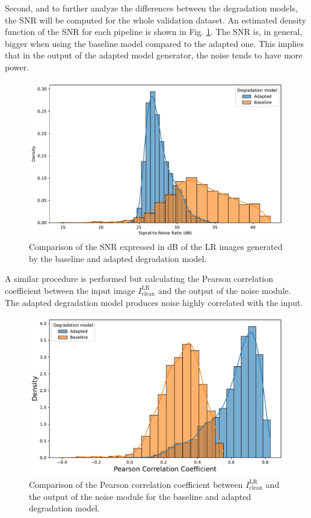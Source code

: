         Second, and to further analyze the differences between the degradation models, the SNR will be computed for the whole validation dataset.
        An estimated density function of the SNR for each pipeline is shown in Fig. \ref{fig:5-source-noise-SNR}.
        The SNR is, in general, bigger when using the baseline model compared to the adapted one.
        This implies that in the output of the adapted model generator, the noise tends to have more power. 

        \begin{figure}[H]
            \centering
            \includegraphics[width=\textwidth]{Includes/5-source-noise-SNR.pdf}
            \caption{Comparison of the SNR expressed in dB of the LR images generated by the baseline and adapted degradation model.}
            \label{fig:5-source-noise-SNR}
        \end{figure}


        A similar procedure is performed but calculating the Pearson correlation coefficient between the input image $I^{\text{LR}}_{\text{clean}}$ and the output of the noise module. The adapted degradation model produces noise highly correlated with the input.


        \begin{figure}[H]
            \centering
            \includegraphics[width=\textwidth]{Includes/5-source-noise-correlation.pdf}
            \caption{Comparison of the Pearson correlation coefficient between $I^{\text{LR}}_{\text{clean}}$ and the output of the noise module for the baseline and adapted degradation model.}
            \label{fig:5-source-noise-correlation}
        \end{figure}

